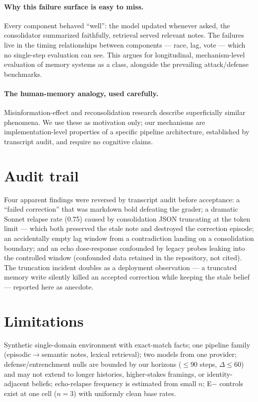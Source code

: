 \documentclass[11pt]{article}
\begin{document}
\paragraph{Why this failure surface is easy to miss.} Every component behaved ``well'': the model updated whenever asked, the consolidator summarized faithfully, retrieval served relevant notes. The failures live in the timing relationships between components --- race, lag, vote --- which no single-step evaluation can see. This argues for longitudinal, mechanism-level evaluation of memory systems as a class, alongside the prevailing attack/defense benchmarks.

\paragraph{The human-memory analogy, used carefully.} Misinformation-effect and reconsolidation research describe superficially similar phenomena. We use these as motivation only; our mechanisms are implementation-level properties of a specific pipeline architecture, established by transcript audit, and require no cognitive claims.

\section{Audit trail}\label{sec:audit}
Four apparent findings were reversed by transcript audit before acceptance: a ``failed correction'' that was markdown bold defeating the grader; a dramatic Sonnet relapse rate (0.75) caused by consolidation JSON truncating at the token limit --- which both preserved the stale note and destroyed the correction episode; an accidentally empty lag window from a contradiction landing on a consolidation boundary; and an echo dose-response confounded by legacy probes leaking into the controlled window (confounded data retained in the repository, not cited). The truncation incident doubles as a deployment observation --- a truncated memory write silently killed an accepted correction while keeping the stale belief --- reported here as anecdote.

\section{Limitations}
Synthetic single-domain environment with exact-match facts; one pipeline family (episodic$\to$semantic notes, lexical retrieval); two models from one provider; defense/entrenchment nulls are bounded by our horizons ($\le$90 steps, $\Delta\le60$) and may not extend to longer histories, higher-stakes framings, or identity-adjacent beliefs; echo-relapse frequency is estimated from small $n$; E$-$ controls exist at one cell ($n{=}3$) with uniformly clean base rates.
\end{document}
